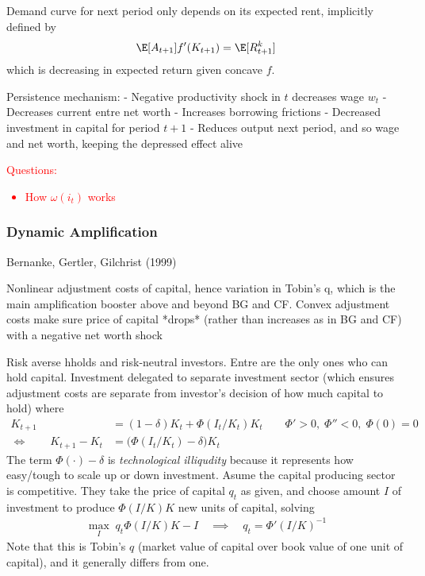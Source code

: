 \documentclass[12pt]{article}
\theoremstyle{plain}
\theoremstyle{definition}
\theoremstyle{remark}
\begin{document}
Demand curve for next period only depends on its expected rent,
implicitly defined by
\begin{align*}
  \E[A_{t+1}]f'(K_{t+1})
  = \E[R_{t+1}^k]
\end{align*}
which is decreasing in expected return given concave $f$.

Persistence mechanism:
- Negative productivity shock in $t$ decreases wage $w_t$
- Decreases current entre net worth
- Increases borrowing frictions
- Decreased investment in capital for period $t+1$
- Reduces output next period, and so wage and net worth, keeping the
depressed effect alive

\textcolor{red}{%
Questions:
\begin{itemize}
  \item How $\omega(i_t)$ works
\end{itemize}
}


\subsubsection{Dynamic Amplification}

Bernanke, Gertler, Gilchrist (1999)

Nonlinear adjustment costs of capital, hence variation in Tobin's q,
which is the main amplification booster above and beyond BG and CF.
Convex adjustment costs make sure price of capital *drops* (rather than
increases as in BG and CF) with a negative net worth shock

Risk averse hholds and risk-neutral investors.
Entre are the only ones who can hold capital.
Investment delegated to separate investment sector (which ensures
adjustment costs are separate from investor's decision of how much
capital to hold) where
\begin{align*}
  K_{t+1}
  &=
  (1-\delta)K_t +
  \Phi(I_t/K_t)
  K_t
  \qquad
  \Phi'>0,\;
  \Phi''<0,\;
  \Phi(0)=0
  \\
  \iff\qquad
  K_{t+1}-K_t
  &=
  \big(
  \Phi(I_t/K_t)
  -\delta
  \big)
  K_t
\end{align*}
The term $\Phi(\cdot)-\delta$ is \emph{technological illiqudity} because
it represents how easy/tough to scale up or down investment.
Asume the capital producing sector is competitive.
They take the price of capital $q_t$ as given, and choose amount $I$
of investment to produce $\Phi(I/K)K$ new units of capital, solving
\begin{align*}
  \max_I
  \;
  q_t\Phi(I/K)K
  -
  I
  \quad\implies\quad
  q_t
  = \Phi'(I/K)^{-1}
\end{align*}
Note that this is Tobin's $q$ (market value of capital over book value
of one unit of capital), and it generally differs from one.
\end{document}
